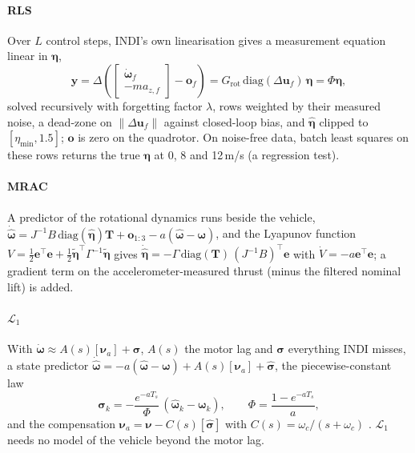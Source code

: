 \documentclass[preprint,12pt,a4paper]{elsarticle}
\newcommand{\vect}[1]{\bm{#1}}
\begin{document}
\paragraph{RLS} Over $L$ control steps, INDI's own linearisation gives a measurement equation linear in $\vect\eta$,
\begin{equation}
\vect y = \Delta\left(\begin{bmatrix}\dot{\vect\omega}_f\\ -m a_{z,f}\end{bmatrix} - \vect o_f\right)
= G_\text{rot}\,\mathrm{diag}(\Delta\vect u_f)\,\vect\eta = \Phi\vect\eta,
\end{equation}
solved recursively with forgetting factor $\lambda$, rows weighted by their measured noise, a dead-zone on $\|\Delta\vect u_f\|$
against closed-loop bias, and $\hat{\vect\eta}$ clipped to $[\eta_{\min}, 1.5]$; $\vect o$ is zero on the quadrotor. On noise-free
data, batch least squares on these rows returns the true $\vect\eta$ at 0, 8 and 12\,m/s (a regression test).

\paragraph{MRAC} A predictor of the rotational dynamics runs beside the vehicle,
$\dot{\hat{\vect\omega}} = J^{-1}B\,\mathrm{diag}(\hat{\vect\eta})\vect T + \vect o_{1:3} - a(\hat{\vect\omega}-\vect\omega)$,
and the Lyapunov function $V = \tfrac12\vect e^\top\vect e + \tfrac12\tilde{\vect\eta}^\top\Gamma^{-1}\tilde{\vect\eta}$ gives
$\dot{\hat{\vect\eta}} = -\Gamma\,\mathrm{diag}(\vect T)\,(J^{-1}B)^\top\vect e$ with $\dot V = -a\vect e^\top\vect e$; a gradient term
on the accelerometer-measured thrust (minus the filtered nominal lift) is added.

\paragraph{$\mathcal{L}_1$} With $\dot{\vect\omega} \approx A(s)[\vect\nu_a] + \vect\sigma$, $A(s)$ the motor lag and $\vect\sigma$
everything INDI misses, a state predictor
$\dot{\hat{\vect\omega}} = -a(\hat{\vect\omega}-\vect\omega) + A(s)[\vect\nu_a] + \hat{\vect\sigma}$, the piecewise-constant law
\begin{equation}
\hat{\vect\sigma}_k = -\frac{e^{-aT_s}}{\Phi}\,(\hat{\vect\omega}_k - \vect\omega_k),\qquad \Phi = \frac{1 - e^{-aT_s}}{a},
\end{equation}
and the compensation $\vect\nu_a = \vect\nu - C(s)[\hat{\vect\sigma}]$ with $C(s) = \omega_c/(s+\omega_c)$ \cite{hovakimyan2010}.
$\mathcal{L}_1$ needs no model of the vehicle beyond the motor lag.
\end{document}
